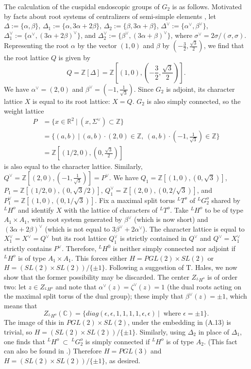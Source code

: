 \documentclass[12pt,letterpaper]{amsart}
\begin{document}
The calculation of the cuspidal endoscopic groups of $G_2$ is as
follows. Motivated by facts
about root systems of centralizers of semi-simple elements
\cite[Ch III, \S 12]{Spa82}, let $\Delta:=\{\alpha,\beta\}$,
$\Delta_1:=\{\alpha,3\alpha+2\beta\}$,
$\Delta_2:=\{\beta,3\alpha+\beta\}$,
$\Delta^{\vee}:=\{\alpha^{\vee},\beta^{\vee}\}$,
$\Delta_1^{\vee}:=\{\alpha^{\vee},(3\alpha+2\beta)^{\vee}\}$,
and $\Delta_2^{\vee}:=\{\beta^{\vee},(3\alpha+\beta)^{\vee}\}$,
where $\sigma^{\vee}=2\sigma/(\sigma,\sigma)$.
Representing the root $\alpha$ by the vector
$(1,0)$ and $\beta$ by $(-\frac{3}{2},\frac{\sqrt{3}}{2})$,
we find that the root lattice $Q$ is given by
\[
Q={\mathbb Z}[\Delta]={\mathbb Z}[(1,0),(-\frac{3}{2},\frac{\sqrt{3}}{2})].
\]
We have $\alpha^{\vee}=(2,0)$ and $\beta^{\vee}=(-1,\frac{1}{\sqrt{3}})$.
Since $G_2$ is adjoint, its character lattice $X$ is equal to its
root lattice: $X=Q$. $G_2$ is also simply connected, so the weight lattice
\[
\begin{split}
P
&=\{x\in {\mathbb R}^2\ |\ (x,\Sigma^{\vee})\subset {\mathbb Z}\}\\
&=\{(a,b)\ |\ (a,b)\cdot (2,0)\in {\mathbb Z},\
(a,b)\cdot (-1,\frac{1}{\sqrt{3}})\in {\mathbb Z}\}\\
&={\mathbb Z}[(1/2,0),(0,\frac{\sqrt{3}}{2})]
\end{split}
\]
is also equal to the character lattice. Similarly,
$Q^{\vee}={\mathbb Z}[(2,0),\allowbreak(-1,\frac{1}{\sqrt{3}})]\allowbreak=P^{\vee}$.
We have $Q_1={\mathbb Z}[(1,0),(0,\sqrt{3})]$,
$P_1={\mathbb Z}[(1/2,0),(0,\sqrt{3}/2)]$,
$Q_1^{\vee}={\mathbb Z}[(2,0),(0,2/\sqrt{3})]$,
and $P_1^{\vee}={\mathbb Z}[(1,0),(0,1/\sqrt{3})]$.
Fix a maximal split torus $^LT^o$ of $^LG_2^o$ shared by $^LH^o$
and identify $X$ with the lattice of characters of $^LT^o$. Take
$^LH^o$ to be of type $A_1\times A_1$, with root system generated by
$\beta^{\vee}$ (which is now short) and $(3\alpha+2\beta)^{\vee}$
(which is not equal to $3\beta^{\vee}+2\alpha^{\vee}$).
The character lattice is equal to $X_1^{\vee}=X^{\vee}=Q^{\vee}$
but its root lattice $Q_1^{\vee}$ is strictly contained in $Q^{\vee}$ and
$Q^{\vee}=X_1^{\vee}$ strictly contains $P^{\vee}$. Therefore, $^LH^0$
is neither
simply connected nor adjoint if $^LH^o$ is of type $A_1\times A_1$.
This forces either $H=PGL(2)\times SL(2)$ or
$H=(SL(2)\times SL(2))/\{\pm 1\}$. Following a suggestion of T. Hales, we now
show that the former possibility may be discarded. The center
$Z_{^LH^o}$ is of order two: let $z\in Z_{^LH^o}$ and note that
$\alpha^{\vee}(z)=\zeta^{\vee}(z)=1$ (the dual roots acting on the maximal
split torus of the dual group); these imply that
$\beta^{\vee}(z)=\pm 1$, which means that
\[
Z_{^LH^o}({\mathbb C})=\{diag(\epsilon,\epsilon,1,1,1,1,\epsilon,\epsilon)\ |\
\text{ where }\epsilon =\pm 1\}.
\]
The image of this in $PGL(2)\times SL(2)$, under the embedding in
(A.13) is trivial, so $H=(SL(2)\times SL(2))/\{\pm 1\}$.
Similarly, using $\Delta_2$ in place of $\Delta_1$,
one finds that $^LH^o\ \subset\ ^LG_2^o$
is simply connected if $^LH^o$ is of type $A_2$. (This fact
can also be found in \cite[ch II, 5.3-5.5]{SS86}.)
Therefore $H=PGL(3)$ and $H=(SL(2)\times SL(2))/\{\pm 1\}$, as desired.
\end{document}
